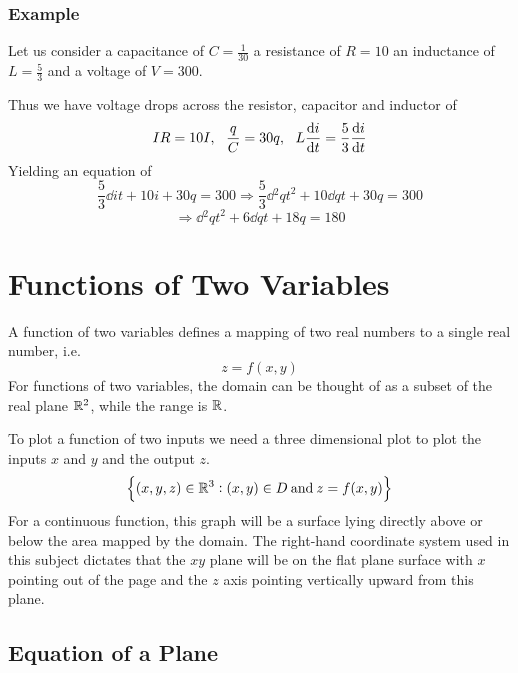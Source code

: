 \documentclass[12pt]{report}
\begin{document}
\begin{flushleft}
\subsubsection*{Example}

Let us consider a capacitance of \(C = \frac{1}{30}\) a resistance of
\(R = 10\) an inductance of \(L = \frac{5}{3}\) and a voltage of \(V = 300\).

\begin{center}    
    Thus we have voltage drops across the resistor, capacitor and inductor of
    \[IR = 10I, \:\:\: \frac{q}{C} = 30q, \:\:\: L\frac{\mathrm{d}i}{\mathrm{d}t} = \frac{5}{3}\frac{\mathrm{d}i}{\mathrm{d}t}\]
    Yielding an equation of
    \[\frac{5}{3}\dd{i}{t} + 10i + 30q = 300 \Rightarrow
    \frac{5}{3}\dd{^2q}{t^2} + 10\dd{q}{t} + 30q = 300\]
    \[\Rightarrow \dd{^2q}{t^2} + 6\dd{q}{t} + 18q = 180\]
\end{center}

\section*{Functions of Two Variables}

A function of two variables defines a mapping of two real numbers to a single
real number, i.e.
\[z = f(x, y)\]
For functions of two variables, the domain can be thought of as a subset of the
real plane \(\mathbb{R}^2\), while the range is \(\mathbb{R}\). \par
To plot a function of two inputs we need a three dimensional plot to plot the
inputs \(x\) and \(y\) and the output \(z\).
\[\set{(x, y, z) \in \mathbb{R}^3 : (x, y) \in D \:\mathrm{and}\:z = f(x, y)}\]
For a continuous function, this graph will be a surface lying directly above or
below the area mapped by the domain. The right-hand coordinate system used in
this subject dictates that the \(xy\) plane will be on the flat plane surface
with \(x\) pointing out of the page and the \(z\) axis pointing vertically
upward from this plane.

\subsection*{Equation of a Plane}


\end{flushleft}
\end{document}
